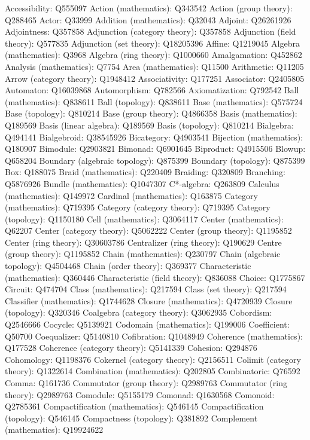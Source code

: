 Accessibility: Q555097
Action (mathematics): Q343542
Action (group theory): Q288465
Actor: Q33999
Addition (mathematics): Q32043
Adjoint: Q26261926
Adjointness: Q357858
Adjunction (category theory): Q357858
Adjunction (field theory): Q577835
Adjunction (set theory): Q18205396
Affine: Q1219045
Algebra (mathematics): Q3968
Algebra (ring theory): Q1000660
Amalgamation: Q452862
Analysis (mathematics): Q7754
Area (mathematics): Q11500
Arithmetic: Q11205
Arrow (category theory): Q1948412
Associativity: Q177251
Associator: Q2405805
Automaton: Q16039868
Automorphism: Q782566
Axiomatization: Q792542
Ball (mathematics): Q838611
Ball (topology): Q838611
Base (mathematics): Q575724
Base (topology): Q810214
Base (group theory): Q4866358
Basis (mathematics): Q189569
Basis (linear algebra): Q189569
Basis (topology): Q810214
Bialgebra: Q494141
Bialgebroid: Q38545926
Bicategory: Q4903541
Bijection (mathematics): Q180907
Bimodule: Q2903821
Bimonad: Q6901645
Biproduct: Q4915506
Blowup: Q658204
Boundary (algebraic topology): Q875399
Boundary (topology): Q875399
Box: Q188075
Braid (mathematics): Q220409
Braiding: Q320809
Branching: Q5876926
Bundle (mathematics): Q1047307
C*-algebra: Q263809
Calculus (mathematics): Q149972
Cardinal (mathematics): Q163875
Category (mathematics): Q719395
Category (category theory): Q719395
Category (topology): Q1150180
Cell (mathematics): Q3064117
Center (mathematics): Q62207
Center (category theory): Q5062222
Center (group theory): Q1195852
Center (ring theory): Q30603786
Centralizer (ring theory): Q190629
Centre (group theory): Q1195852
Chain (mathematics): Q230797
Chain (algebraic topology): Q4504468
Chain (order theory): Q369377
Characteristic (mathematics): Q360446
Characteristic (field theory): Q836088
Choice: Q1775867
Circuit: Q474704
Class (mathematics): Q217594
Class (set theory): Q217594
Classifier (mathematics): Q1744628
Closure (mathematics): Q4720939
Closure (topology): Q320346
Coalgebra (category theory): Q3062935
Cobordism: Q2546666
Cocycle: Q5139921
Codomain (mathematics): Q199006
Coefficient: Q50700
Coequalizer: Q5140810
Cofibration: Q1048949
Coherence (mathematics): Q177528
Coherence (category theory): Q5141339
Cohesion: Q294876
Cohomology: Q1198376
Cokernel (category theory): Q2156511
Colimit (category theory): Q1322614
Combination (mathematics): Q202805
Combinatoric: Q76592
Comma: Q161736
Commutator (group theory): Q2989763
Commutator (ring theory): Q2989763
Comodule: Q5155179
Comonad: Q1630568
Comonoid: Q2785361
Compactification (mathematics): Q546145
Compactification (topology): Q546145
Compactness (topology): Q381892
Complement (mathematics): Q19924622
